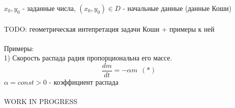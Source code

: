 \documentclass[14pt]{extarticle}
\begin{document}
$x_0, y_0$ - заданные числа, $(x_0, y_0) \in D$ - начальные данные (данные
Коши)
\\\\
TODO: геометрическая интепретация задачи Коши + примеры к ней
\\\\
Примеры:\\
1) Скорость распада радия пропорциональна его массе. 
\begin{equation*} \label{eq:*}
    \frac{dm}{dt} = -\alpha m \ \ (*)
\end{equation*}
$\alpha = const > 0$ - коэффициент распада 
\\\\ 
WORK IN PROGRESS
\end{document}
